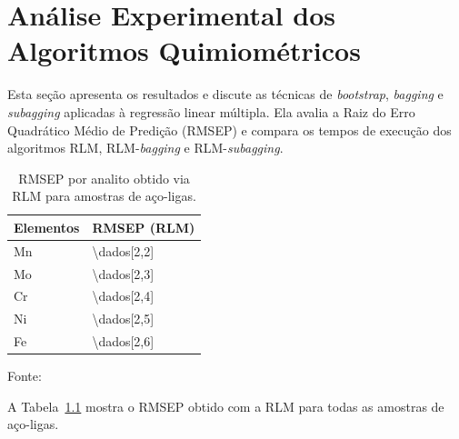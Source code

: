 \chapter{Análise Experimental dos Algoritmos Quimiométricos}%
\label{sec:result}
Esta seção apresenta os resultados e discute as técnicas de \textit{bootstrap}, \textit{bagging} e \textit{subagging} aplicadas à regressão linear múltipla. Ela avalia a Raiz do Erro Quadrático Médio de Predição (RMSEP) e compara os tempos de execução dos algoritmos RLM, RLM-\textit{bagging} e RLM-\textit{subagging}.

\def\namostras{Nº de amostras}


\begin{table}[!htbp]
\centering
\small
\begin{threeparttable}
\caption{RMSEP por analito obtido via RLM para amostras de aço-ligas.}
\label{tab:rmseprlm}
\begin{tabular}{p{3cm} p{4cm}} %
\toprule
\textbf{Elementos} & \textbf{RMSEP (RLM)} \\ 
\midrule
Mn & \num{\dados[2,2]} \\ 
Mo & \num{\dados[2,3]} \\ 
Cr & \num{\dados[2,4]} \\ 
Ni & \num{\dados[2,5]} \\ 
Fe & \num{\dados[2,6]} \\ 
\bottomrule
\end{tabular}
\begin{tablenotes}[flushleft] %
    \footnotesize
    \item \footnotesize Fonte:~\oautor
\end{tablenotes}
\end{threeparttable}
\end{table}

A Tabela~\ref{tab:rmseprlm} mostra o RMSEP obtido com a RLM para todas as amostras de aço-ligas.

